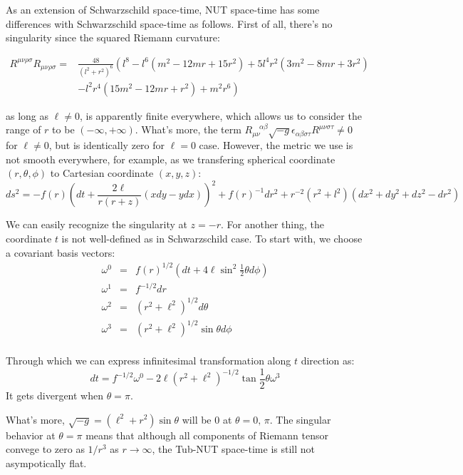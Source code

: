 \documentclass[12pt, a4paper]{article}
\numberwithin{equation}{section}
\newcommand{\be}{\begin{equation}}
\newcommand{\ee}{\end{equation}}
\begin{document}
As an extension of Schwarzschild space-time, NUT space-time has some differences with Schwarzschild space-time as follows. First of all, there's no singularity since the squared Riemann curvature:

\be
\begin{aligned}
	R^{\mu\nu\rho\sigma}R_{\mu\nu\rho\sigma} =&\frac{48}{\left(l^2+r^2\right)^6}\left(l^8-l^6 \left(m^2-12 m r+15 r^2\right)+5 l^4 r^2 \left(3 m^2-8 m r+3 r^2\right)\right.&\\
	&\left.-l^2 r^4 \left(15 m^2-12 m r+r^2\right)+m^2 r^6\right)&
\end{aligned}
\ee

as long as $\ell\ne 0$, is apparently finite everywhere, which allows us to consider the range of $r$ to be $(-\infty, +\infty)$. What's more, the term $R_{\mu\nu}^{\quad\alpha\beta}\sqrt{-g}\epsilon_{\alpha\beta\sigma\tau}R^{\mu\nu\sigma\tau}\ne 0$ for $\ell\ne 0$, but is identically zero for $\ell = 0$ case. However, the metric we use is not smooth everywhere, for example, as we transfering spherical coordinate $(r, \theta, \phi)$ to Cartesian coordinate $(x,y,z)$:
\be
ds^2 = -f(r)\left(dt + \frac{2\ell}{r(r+z)}(xdy-ydx)\right)^2 + f(r)^{-1}dr^2 + r^{-2}(r^2+l^2)(dx^2+dy^2+dz^2-dr^2)
\ee

We can easily recognize the singularity at $z = -r$. For another thing, the coordinate $t$ is not well-defined as in Schwarzschild case. To start with, we choose a covariant basis vectors:
\be
\begin{aligned}
	\omega^0 &=& f(r)^{1/2}(dt + 4\ell \sin^2\frac{1}{2}\theta d\phi)\\
	\omega^1 &=& f^{-1/2}dr\\
	\omega^2 &=& (r^2 + \ell^2)^{1/2}d\theta\\
	\omega^3 &=& (r^2 + \ell^2)^{1/2}\sin\theta d\phi\\
\end{aligned}	
\ee

Through which we can express infinitesimal transformation along $t$ direction as:
\be
dt = f^{-1/2}\omega^0 -2\ell(r^2+\ell^2)^{-1/2}\tan\frac{1}{2}\theta \omega^3
\ee
It gets divergent when $\theta = \pi$.

What's more, $\sqrt{-g} = (\ell^2 + r^2)\sin\theta$ will be 0 at $\theta = 0,\, \pi$. The singular behavior at $\theta = \pi$ means that although all components of Riemann tensor convege to zero as $1/r^3$ as $r\rightarrow \infty$, the Tub-NUT space-time is still not asympotically flat.
\end{document}
